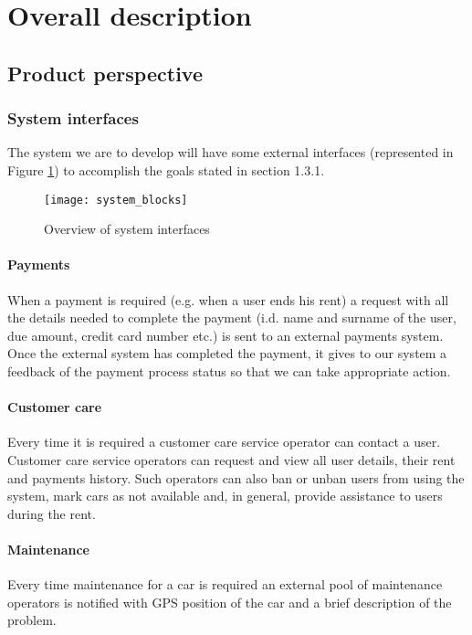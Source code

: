\section{Overall description}
\subsection{Product perspective}
	\subsubsection{System interfaces}\label{sec:systemInterfaces}
		The system we are to develop will have some external interfaces (represented in Figure \ref{fig:systemInterfaces}) to accomplish the goals stated in section 1.3.1.
		\begin{figure}[h]
			\centering
			\texttt{[image: system\_blocks]}
			\caption{
				\label{fig:systemInterfaces} 
				Overview of system interfaces
			}
		\end{figure}
	\paragraph{Payments}
	When a payment is required (e.g. when a user ends his rent) a request with all the details needed to complete the payment (i.d. name and surname of the user, due amount, credit card number etc.) is sent to an external payments system. Once the external system has completed the payment, it gives to our system a feedback of the payment process status so that we can take appropriate action.
	
	\paragraph{Customer care} Every time it is required a customer care service operator can contact a user. Customer care service operators can request and view all user details, their rent and payments history. Such operators can also ban or unban users from using the system, mark cars as not available and, in general, provide assistance to users during the rent.

	\paragraph{Maintenance} Every time maintenance for a car is required an external pool of maintenance operators is notified with GPS position of the car and a brief description of the problem.

